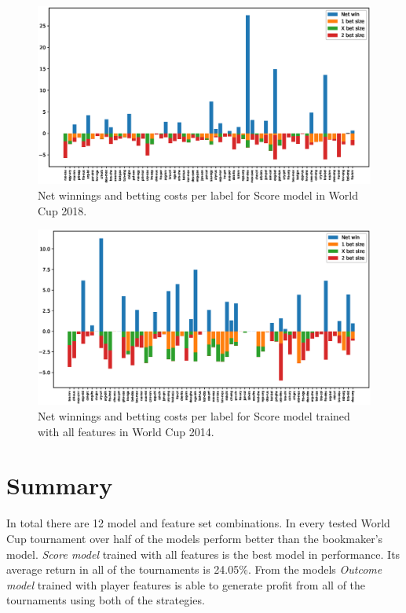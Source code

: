 \begin{figure}[H]
    \centering
    \includegraphics[width=1\textwidth]{img/match_level_2018_score_win_cost_.eps}
    \caption{Net winnings and betting costs per label for Score model in World Cup 2018.}
    \label{fig:net_win_cost_2018}
\end{figure}

\begin{figure}[H]
    \centering
    \includegraphics[width=1\textwidth]{img/match_level_2014_score_win_cost_.eps}
    \caption{Net winnings and betting costs per label for Score model trained with all features in World Cup 2014.}
    \label{fig:net_win_cost_2014}
\end{figure}

\section{Summary}
In total there are 12 model and feature set combinations. In every tested World Cup tournament over half of the models perform better than the bookmaker's model. \textit{Score model} trained with all features is the best model in performance. Its average return in all of the tournaments is 24.05\%. From the models \textit{Outcome model} trained with player features is able to generate profit from all of the tournaments using both of the strategies.

